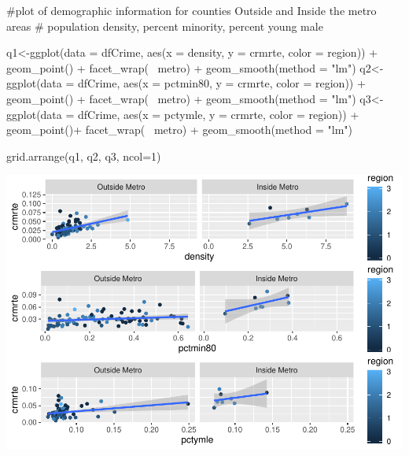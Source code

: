 \documentclass[]{article}
\newenvironment{Shaded}{}{}
\newcommand{\CommentTok}[1]{\textcolor[rgb]{0.00,0.50,0.00}{#1}}
\newcommand{\DataTypeTok}[1]{#1}
\newcommand{\DecValTok}[1]{#1}
\newcommand{\KeywordTok}[1]{\textcolor[rgb]{0.00,0.00,1.00}{#1}}
\newcommand{\NormalTok}[1]{#1}
\newcommand{\OperatorTok}[1]{#1}
\newcommand{\StringTok}[1]{\textcolor[rgb]{0.00,0.50,0.50}{#1}}
\begin{document}
\begin{Shaded}
\begin{Highlighting}[]
\CommentTok{#plot of demographic information for counties Outside and Inside the metro areas}
\CommentTok{# population density, percent minority, percent young male}

\NormalTok{q1<-}\KeywordTok{ggplot}\NormalTok{(}\DataTypeTok{data =}\NormalTok{ dfCrime, }\KeywordTok{aes}\NormalTok{(}\DataTypeTok{x =}\NormalTok{ density, }\DataTypeTok{y =}\NormalTok{ crmrte, }\DataTypeTok{color =}\NormalTok{ region)) }\OperatorTok{+}\StringTok{ }
\StringTok{      }\KeywordTok{geom_point}\NormalTok{() }\OperatorTok{+}\StringTok{ }\KeywordTok{facet_wrap}\NormalTok{(}\OperatorTok{~}\StringTok{ }\NormalTok{metro) }\OperatorTok{+}
\StringTok{  }\KeywordTok{geom_smooth}\NormalTok{(}\DataTypeTok{method =} \StringTok{"lm"}\NormalTok{)}
\NormalTok{q2<-}\KeywordTok{ggplot}\NormalTok{(}\DataTypeTok{data =}\NormalTok{ dfCrime, }\KeywordTok{aes}\NormalTok{(}\DataTypeTok{x =}\NormalTok{ pctmin80, }\DataTypeTok{y =}\NormalTok{ crmrte, }\DataTypeTok{color =}\NormalTok{ region)) }\OperatorTok{+}\StringTok{ }
\StringTok{      }\KeywordTok{geom_point}\NormalTok{() }\OperatorTok{+}\StringTok{ }\KeywordTok{facet_wrap}\NormalTok{(}\OperatorTok{~}\StringTok{ }\NormalTok{metro) }\OperatorTok{+}
\StringTok{  }\KeywordTok{geom_smooth}\NormalTok{(}\DataTypeTok{method =} \StringTok{"lm"}\NormalTok{)}
\NormalTok{q3<-}\KeywordTok{ggplot}\NormalTok{(}\DataTypeTok{data =}\NormalTok{ dfCrime, }\KeywordTok{aes}\NormalTok{(}\DataTypeTok{x =}\NormalTok{ pctymle, }\DataTypeTok{y =}\NormalTok{ crmrte, }\DataTypeTok{color =}\NormalTok{ region)) }\OperatorTok{+}\StringTok{ }
\StringTok{      }\KeywordTok{geom_point}\NormalTok{()}\OperatorTok{+}\StringTok{ }\KeywordTok{facet_wrap}\NormalTok{(}\OperatorTok{~}\StringTok{ }\NormalTok{metro) }\OperatorTok{+}
\StringTok{  }\KeywordTok{geom_smooth}\NormalTok{(}\DataTypeTok{method =} \StringTok{"lm"}\NormalTok{)}

\KeywordTok{grid.arrange}\NormalTok{(q1, q2, q3, }\DataTypeTok{ncol=}\DecValTok{1}\NormalTok{)}
\end{Highlighting}
\end{Shaded}

\includegraphics{Bagnard_Gaustad_Hartman_Leung_Lab_3_files/figure-latex/unnamed-chunk-23-1.pdf}
\end{document}
